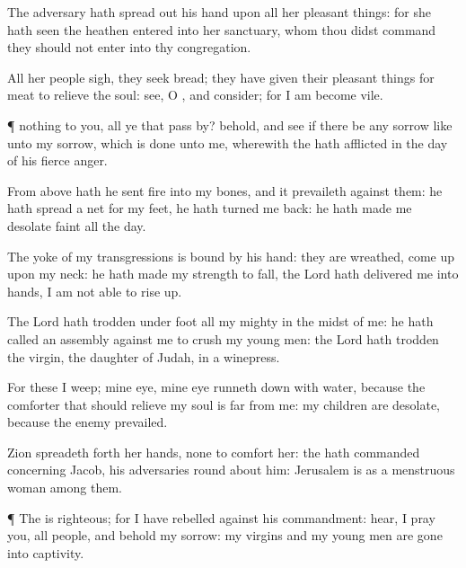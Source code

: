 {The
adversary hath spread
out his
hand upon all her pleasant
things: for she hath
seen
{} the
heathen
entered into her
sanctuary, whom thou didst
command
{} they should not
enter into thy
congregation.

All her
people
sigh, they
seek
bread; they have
given their pleasant
things for
meat to
relieve the
soul:
see, O
{}, and
consider; for I am become
vile.


\par }{\PP {}¶
{} nothing to you, all ye that
pass
by?
behold, and
see if there
be any
sorrow like unto my
sorrow, which is
done unto me, wherewith the
{} hath
afflicted
{} in the
day of his
fierce
anger.

From
above hath he
sent
fire into my
bones, and it
prevaileth against them: he hath
spread a
net for my
feet, he hath
turned me
back: he hath
made me
desolate
{}
faint all the
day.

The
yoke of my
transgressions is
bound by his
hand: they are
wreathed,
{} come
up upon my
neck: he hath made my
strength to
fall, the
Lord hath
delivered me into
{}
hands,
{} I am not
able to rise
up.

The
Lord hath trodden under
foot all my
mighty
{} in the
midst of me: he hath
called an
assembly against me to
crush my young
men: the
Lord hath
trodden the
virgin, the
daughter of
Judah,
{} in a
winepress.

For these
{} I
weep; mine
eye, mine
eye runneth
down with
water, because the
comforter that should
relieve my
soul is
far from me: my
children are
desolate, because the
enemy
prevailed.

Zion spreadeth
forth her
hands,
{} none to
comfort her: the
{} hath
commanded concerning
Jacob,
{} his
adversaries
{} round
about him:
Jerusalem is as a menstruous
woman among them.


\par }{\PP {}¶ The
{} is
righteous; for I have
rebelled against his
commandment:
hear, I pray you, all
people, and
behold my
sorrow: my
virgins and my young
men are
gone into
captivity.

}
